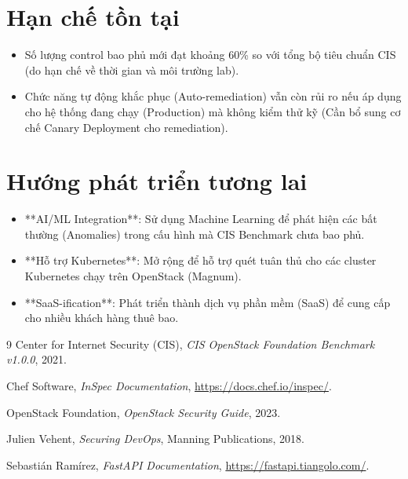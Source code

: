 \documentclass[12pt,a4paper]{report}
\begin{document}
\section{Hạn chế tồn tại}
\begin{itemize}
    \item Số lượng control bao phủ mới đạt khoảng 60\% so với tổng bộ tiêu chuẩn CIS (do hạn chế về thời gian và môi trường lab).
    \item Chức năng tự động khắc phục (Auto-remediation) vẫn còn rủi ro nếu áp dụng cho hệ thống đang chạy (Production) mà không kiểm thử kỹ (Cần bổ sung cơ chế Canary Deployment cho remediation).
\end{itemize}

\section{Hướng phát triển tương lai}
\begin{itemize}
    \item **AI/ML Integration**: Sử dụng Machine Learning để phát hiện các bất thường (Anomalies) trong cấu hình mà CIS Benchmark chưa bao phủ.
    \item **Hỗ trợ Kubernetes**: Mở rộng để hỗ trợ quét tuân thủ cho các cluster Kubernetes chạy trên OpenStack (Magnum).
    \item **SaaS-ification**: Phát triển thành dịch vụ phần mềm (SaaS) để cung cấp cho nhiều khách hàng thuê bao.
\end{itemize}

\begin{thebibliography}{9}
Center for Internet Security (CIS), 
\textit{CIS OpenStack Foundation Benchmark v1.0.0}, 
2021.

Chef Software, 
\textit{InSpec Documentation}, 
\url{https://docs.chef.io/inspec/}.

OpenStack Foundation, 
\textit{OpenStack Security Guide}, 
2023.

Julien Vehent, 
\textit{Securing DevOps}, 
Manning Publications, 2018.

Sebastián Ramírez, 
\textit{FastAPI Documentation}, 
\url{https://fastapi.tiangolo.com/}.
\end{thebibliography}
\end{document}
